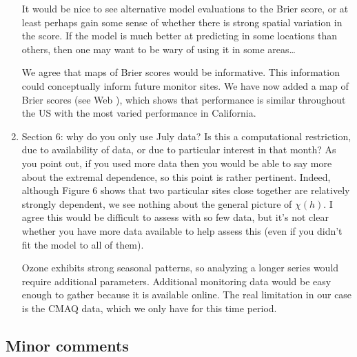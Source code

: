 \documentclass[11pt]{article}
\begin{document}
\begin{enumerate}[1.]
  It would be nice to see alternative model evaluations to the Brier score, or at least perhaps gain some sense of whether there is strong spatial variation in the score. If the model is much better at predicting in some locations than others, then one may want to be wary of using it in some areas\ldots \\

  \begin{response}
    We agree that maps of Brier scores would be informative.
    This information could conceptually inform future monitor sites.
    We have now added a map of Brier scores (see Web ), which shows that performance is similar throughout the US with the most varied performance in California.
  \end{response}

  \item Section 6: why do you only use July data? Is this a computational restriction, due to availability of data, or due to particular interest in that month? As you point out, if you used more data then you would be able to say more about the extremal dependence, so this point is rather pertinent. Indeed, although Figure 6 shows that two particular sites close together are relatively strongly dependent, we see nothing about the general picture of $\chi(h)$. I agree this would be difficult to assess with so few data, but it’s not clear whether you have more data available to help assess this (even if you didn’t fit the model to all of them). \\

  \begin{response}
    Ozone exhibits strong seasonal patterns, so analyzing a longer series would require additional parameters.
    Additional monitoring data would be easy enough to gather because it is available online.
    The real limitation in our case is the CMAQ data, which we only have for this time period.
  \end{response}
\end{enumerate}

\subsection*{Minor comments}
\end{document}

